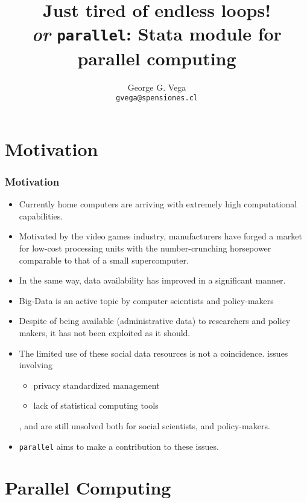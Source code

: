 \documentclass[11pt, handout]{beamer}
\title[{\tt parallel}]{Just tired of endless loops! \\ {\it \footnotesize or} {\normalsize {\tt parallel}: Stata module for parallel computing}}
\author[GGV]{George G. Vega\\ {\tt \scriptsize gvega@spensiones.cl}}
\institute[SPensiones]{Chilean Pension Supervisor}
\begin{document}


\section{Motivation}

\begin{frame}[allowframebreaks=.8]
\frametitle{Motivation}
\begin{itemize}[<-+>]
\item Currently home computers are arriving with extremely high computational capabilities. 
\item Motivated by the video games industry, manufacturers have forged a market for low-cost processing units with the number-crunching horsepower comparable to that of a small supercomputer.

\item In the same way, data availability has improved in a significant manner.
\item Big-Data is an active topic by computer scientists and policy-makers
\item Despite of being available (administrative data) to researchers and policy makers, it has not been exploited as it should.
\item The limited use of these social data resources is not a coincidence. issues involving
\begin{itemize}
\item privacy standardized management
\item lack of statistical computing tools
\end{itemize},  and  are still unsolved both for social scientists, and policy-makers. 
\item {\tt parallel} aims to make a contribution to these issues.
\end{itemize}
\end{frame}

\section{Parallel Computing}
\end{document}
